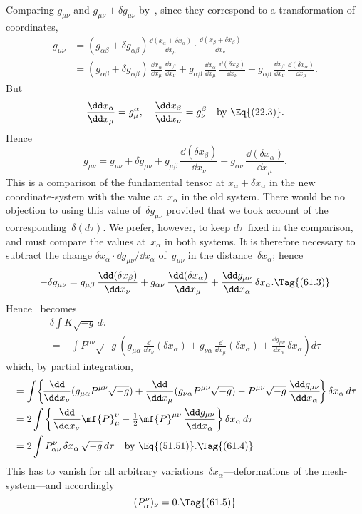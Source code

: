 \documentclass[12pt]{book}
\begin{document}
Comparing $g_{\mu\nu}$ and $g_{\mu\nu} + \delta g_{\mu\nu}$ by~, since they correspond to a transformation
of coordinates,
\begin{align*}
  g_{\mu\nu} &= (g_{\alpha\beta} + \delta g_{\alpha\beta})
        \frac{\dd(x_{\alpha} + \delta x_{\alpha})}{\dd x_{\mu}}
  \cdot \frac{\dd(x_{\beta} + \delta x_{\beta})}{\dd x_{\nu}} \\
  &= (g_{\alpha\beta} + \delta g_{\alpha\beta})\,
  \frac{\dd x_{\alpha}}{\dd x_{\mu}}\, \frac{\dd x_{\beta}}{\dd x_{\nu}}
  + g_{\alpha\beta}\,
  \frac{\dd x_{\alpha}}{\dd x_{\mu}}\, \frac{\dd (\delta x_{\beta})}{\dd x_{\nu}}
  + g_{\alpha\beta}\,
  \frac{\dd x_{\beta}}{\dd x_{\nu}}\, \frac{\dd (\delta x_{\alpha})}{\dd x_{\mu}}.
\end{align*}
But
\[
\frac{\dd x_{\alpha}}{\dd x_{\mu}} = g_{\mu}^{\alpha},\quad
\frac{\dd x_{\beta}}{\dd x_{\nu}} = g_{\nu}^{\beta}\quad\text{by~\Eq{(22.3)}.}
\]
Hence
\[
g_{\mu\nu} = g_{\mu\nu} + \delta g_{\mu\nu}
+ g_{\mu\beta}\, \frac{\dd(\delta x_{\beta})}{\dd x_{\nu}}
+ g_{\alpha\nu}\, \frac{\dd(\delta x_{\alpha})}{\dd x_{\mu}}.
\]
This is a comparison of the fundamental tensor at $x_{\alpha} + \delta x_{\alpha}$ in the new
coordinate\hyp{}system with the value at~$x_{\alpha}$ in the old system. There would be no
objection to using this value of~$\delta g_{\mu\nu}$ provided that we took account of the
corresponding~$\delta(d\tau)$. We prefer, however, to keep $d\tau$~fixed in the comparison,
and must compare the values at~$x_{\alpha}$ in both systems. It is therefore necessary
to subtract the change $\delta x_{\alpha} \cdot \dd g_{\mu\nu}/\dd x_{\alpha}$ of~$g_{\mu\nu}$ in the distance~$\delta x_{\alpha}$; hence
\[
-\delta g_{\mu\nu}
= g_{\mu\beta}\, \frac{\dd(\delta x_{\beta})}{\dd x_{\nu}}
+ g_{\alpha\nu}\, \frac{\dd(\delta x_{\alpha})}{\dd x_{\mu}}
+ \frac{\dd g_{\mu\nu}}{\dd x_{\alpha}}\, \delta x_{\alpha}.
\Tag{(61.3)}
\]
Hence ~becomes
\begin{multline*}
\delta \int K \sqrt{-g}\, d\tau \\
= -\int P^{\mu\nu} \sqrt{-g} \left(
g_{\mu\alpha}\, \frac{\dd}{\dd x_{\nu}} (\delta x_{\alpha})
+ g_{\nu\alpha}\, \frac{\dd}{\dd x_{\mu}} (\delta x_{\alpha})
+ \frac{\dd g_{\mu\nu}}{\dd x_{\alpha}}\, \delta x_{\alpha}
\right) d\tau
\end{multline*}
which, by partial integration,
\begin{align*}
  &= \int\! \left\{\!\frac{\dd}{\dd x_{\nu}} (g_{\mu\alpha} P^{\mu\nu} \sqrt{-g})
  + \frac{\dd}{\dd x_{\mu}} (g_{\nu\alpha} P^{\mu\nu} \sqrt{-g})
  - P^{\mu\nu} \sqrt{-g}\, \frac{\dd g_{\mu\nu}}{\dd x_{\alpha}}\!\right\} \delta x_{\alpha}\, d\tau \\
  &= 2\int \left\{\frac{\dd}{\dd x_{\nu}} \mf{P}_{\mu}^{\nu}
  - \tfrac{1}{2} \mf{P}^{\mu\nu}\, \frac{\dd g_{\mu\nu}}{\dd x_{\alpha}}\right\} \delta x_{\alpha}\, d\tau \\
  &= 2\int P_{\alpha\nu}^{\nu}\, \delta x_{\alpha}\, \sqrt{-g}\, d\tau
  \quad\text{by~\Eq{(51.51)}.}
  \Tag{(61.4)}
\end{align*}
This has to vanish for all arbitrary variations~$\delta x_{\alpha}$---deformations of the mesh\hyp{}system---and
accordingly
\[
(P_{\alpha}^{\nu})_{\nu} = 0.
\Tag{(61.5)}
\]
\end{document}
